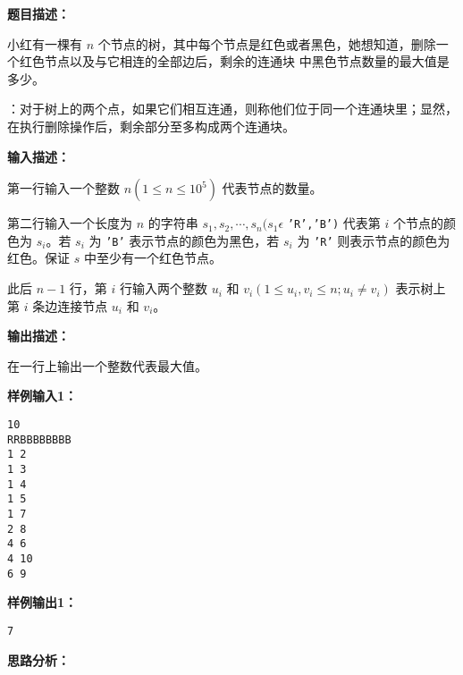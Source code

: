 \documentclass[a4paper]{ctexart}
\begin{document}
\vspace{10pt}

\noindent\textbf{题目描述：}

小红有一棵有 $n$ 个节点的树，其中每个节点是红色或者黑色，她想知道，删除一个红色节点以及与它相连的全部边后，剩余的连通块 \dag 中黑色节点数量的最大值是多少。

\dag：对于树上的两个点，如果它们相互连通，则称他们位于同一个连通块里；显然，在执行删除操作后，剩余部分至多构成两个连通块。

\noindent\textbf{输入描述：}

第一行输入一个整数 $n (1 \leq n \leq 10^5)$ 代表节点的数量。

第二行输入一个长度为 $n$ 的字符串 $s_1,s_2,\cdots,s_n (s_1 \epsilon$ \texttt{{'R','B'})} 代表第 $i$ 个节点的颜色为 $s_i$。若 $s_i$ 为 \texttt{'B'} 表示节点的颜色为黑色，若 $s_i$ 为 \texttt{'R'} 则表示节点的颜色为红色。保证 $s$ 中至少有一个红色节点。

此后 $n-1$ 行，第 $i$ 行输入两个整数 $u_i$ 和 $v_i(1 \leq u_i, v_i \leq n; u_i \neq v_i)$ 表示树上第 $i$ 条边连接节点 $u_i$ 和 $v_i$。

\noindent\textbf{输出描述：} 

在一行上输出一个整数代表最大值。

\noindent\textbf{样例输入1：}

\lstset{numbers=none}
\begin{lstlisting}
10
RRBBBBBBBB
1 2
1 3
1 4
1 5
1 7 
2 8
4 6
4 10
6 9
\end{lstlisting}
\lstset{numbers=left}

\noindent\textbf{样例输出1：}
\lstset{numbers=none}
\begin{lstlisting}
7
\end{lstlisting}
\lstset{numbers=left}


\vspace{10pt}

\noindent\textbf{思路分析：}
\end{document}
